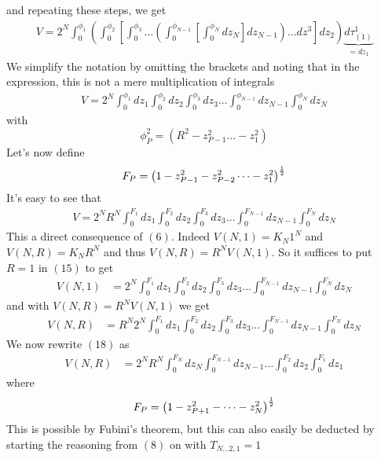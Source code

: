 and repeating these steps, we get
\begin{align}
V = 2^N\int_{0}^{\phi_{1}}\left(\int_{0}^{\phi_{2}}\left[\int_{0}^{\phi_{3}}\dots\left(\int_{0}^{\phi_{N-1}}\left[\int_{0}^{\phi_{N}}dz_{N}\right ]dz_{N-1}\right)\dots dz^3\right]dz_2\right)\underbrace{d\tau_{(1)}^{1}}_{=dz_1}
\end{align}
We simplify the notation by omitting the brackets and noting that in the expression, this is not a mere multiplication of integrals
\begin{align}
V = 2^N\int_{0}^{\phi_{1}}dz_1\int_{0}^{\phi_{2}}dz_2\int_{0}^{\phi_{3}}dz_3\dots\int_{0}^{\phi_{N-1}}dz_{N-1}\int_{0}^{\phi_{N}}dz_{N}
\end{align}
with 
$$\phi_{P}^2 = \left(R^2 - z_{P-1}^2\dots  -z_{1}^2\right)$$
Let's now define $$F_P=\left(1- z_{P-1}^2- z_{P-2}^2\dots  -z_{1}^2\right)^{\frac{1}{2}}$$
It's easy to see that
\begin{align}
V = 2^N R^N \int_{0}^{F_{1}}dz_1\int_{0}^{F_{2}}dz_2\int_{0}^{F_{3}}dz_3\dots\int_{0}^{F_{N-1}}dz_{N-1}\int_{0}^{F_{N}}dz_{N}
\end{align}
This a direct consequence of $(6)$. Indeed $V(N, 1) =K_{N}1^{N}$ and $V(N, R) =K_{N}R^{N}$ and thus $V(N, R) =R^{N}V(N, 1)$. So it suffices to put $R=1$ in $(15)$ to get 
\begin{align}
V(N, 1) &= 2^N\int_{0}^{F_{1}}dz_1\int_{0}^{F_{2}}dz_2\int_{0}^{F_{3}}dz_3\dots\int_{0}^{F_{N-1}}dz_{N-1}\int_{0}^{F_{N}}dz_{N}\end{align}
and with $V(N, R) =R^{N}V(N, 1)$ we get 
\begin{align}
V(N, R) &= R^N2^N\int_{0}^{F_{1}}dz_1\int_{0}^{F_{2}}dz_2\int_{0}^{F_{3}}dz_3\dots\int_{0}^{F_{N-1}}dz_{N-1}\int_{0}^{F_{N}}dz_{N}
\end{align}
We now rewrite $(18)$ as
\begin{align}
V(N, R) &= 2^NR^N\int_{0}^{F_{N}}dz_N\int_{0}^{F_{N-1}}dz_{N-1}\dots\int_{0}^{F_{2}}dz_{2}\int_{0}^{F_{1}}dz_{1}
\end{align} 
where 
$$F_P=\left(1-z_{P+1}^2-\dots - z_N^2\right)^{\frac{1}{2}}$$
This is possible by Fubini's theorem, but this can also easily be deducted by starting the reasoning from $(8)$ on with $T_{N\dots 2,1} =  1$

